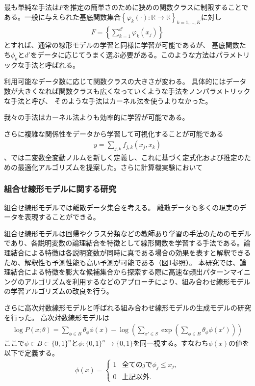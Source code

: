 最も単純な手法は$F$を推定の簡単さのために狭めの関数クラスに制限することである。一般に与えられた基底関数集合$\left\{\varphi_k(\cdot):\mathbb{R} \to \mathbb{R} \right\}_{k=1,\ldots,K}$に対し
\begin{align*}
  F=\left\{  \sum_{k=1}^{d’} \varphi_k(x_j) \right\}
\end{align*}
とすれば、通常の線形モデルの学習と同様に学習が可能であるが、
基底関数たち$\phi_k$と$d'$をデータに応じてうまく選ぶ必要がある。このような方法はパラメトリックな手法と呼ばれる。

利用可能なデータ数に応じて関数クラスの大きさが変わる。
具体的にはデータ数が大きくなれば関数クラスも広くなっていくような手法をノンパラメトリックな手法と呼び、
そのような手法はカーネル法を使うよりなかった。

我々の手法はカーネル法よりも効率的に学習が可能である。

さらに複雑な関係性をデータから学習して可視化することが可能である
\begin{align*}
    y = \sum_{j,k} f_{j,k} (x_j,x_k)
\end{align*}
\cite{KM01}、\cite{KM02}では二変数全変動ノルムを新しく定義し、これに基づく定式化および推定のための最適化アルゴリズムを提案した。さらに計算機実験において




\subsubsection{組合せ線形モデルに関する研究}

組合せ線形モデルでは離散データ集合を考える。
離散データも多くの現実のデータを表現することができる。

組合せ線形モデルは回帰やクラス分類などの教師あり学習の手法のためのモデルであり、各説明変数の論理結合を特徴として線形関数を学習する手法である\cite{LMY01}。論理結合による特徴は各説明変数が同時に真である場合の効果を表すと解釈できるため、解釈性も予測性能も高い予測が可能である（図1参照）。
本研究では、論理結合による特徴を膨大な候補集合から探索する際に高速な頻出パターンマイニングのアルゴリズムを利用するなどのアプローチにより、組み合わせ線形モデルの学習アルゴリズムの改良を行う。

さらに高次対数線形モデルと呼ばれる組み合わせ線形モデルの生成モデルの研究を行った。
高次対数線形モデルは
\begin{align*}
    \log P(x;\theta) = \sum_{\phi\in B} \theta_\phi \phi(x)  - \log\left( \sum_{x'\in S} \exp\left( \sum_{\phi\in B} \theta_\phi \phi(x') \right) \right)    
\end{align*}
ここで$\phi \in B \subset \{0,1\}^n$と$\phi:\{0,1\}^n\to \{0,1\} $を同一視する。すなわち$\phi(x)$の値を以下で定義する。
\begin{align*}
    \phi(x)  = \begin{cases}
    1 & 全ての j で　\phi_j \le x_j, \\
    0 & 上記以外.
    \end{cases}
\end{align*}

